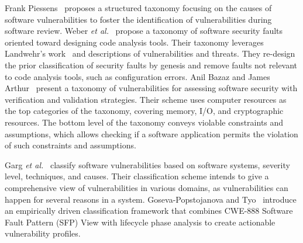 \par
Frank Piessens~\cite{Piessens2002ATO} proposes a structured taxonomy focusing on the causes of software vulnerabilities to foster the identification of vulnerabilities during software review. Weber \textit{et al.}~\cite{Weber2005ASF} propose a taxonomy of software security faults oriented toward designing code analysis tools. Their taxonomy leverages Landwehr’s work~\cite{taxonomy_security_flaws} and descriptions of vulnerabilities and threats. They re-design the prior classification of security faults by genesis and remove faults not relevant to code analysis tools, such as configuration errors. Anil Bazaz and James Arthur~\cite{Bazaz2007TowardsAT} present a taxonomy of vulnerabilities for assessing software security with verification and validation strategies. Their scheme uses computer resources as the top categories of the taxonomy, covering memory, I/O, and cryptographic resources. The bottom level of the taxonomy conveys violable constraints and assumptions, which allows checking if a software application permits the violation of such constraints and assumptions.
\par
Garg \textit{et al.}~\cite{Garg2019AnalysisOS} classify software vulnerabilities based on software systems, severity level, techniques, and causes. Their classification scheme intends to give a comprehensive view of vulnerabilities in various domains, as vulnerabilities can happen for several reasons in a system. Goseva-Popstojanova and Tyo~\cite{GosevaPopstojanova2017SecurityVP} introduce an empirically driven classification framework that combines CWE-888 Software Fault Pattern (SFP) View with lifecycle phase analysis to create actionable vulnerability profiles.
